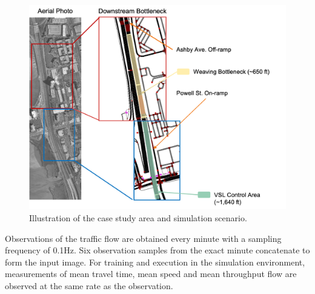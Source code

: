 \documentclass[11pt, letterpaper]{article}
\begin{document}
\begin{figure}[!ht]
    \centering
    \includegraphics[width=\textwidth]{img/sim_area.png}
    \caption{Illustration of the case study area and simulation scenario.}
    \label{fig:3}
\end{figure}

Observations of the traffic flow are obtained every minute with a sampling frequency of 0.1Hz. Six observation samples from the exact minute concatenate to form the input image. For training and execution in the simulation environment, measurements of mean travel time, mean speed and mean throughput flow are observed at the same rate as the observation.
\end{document}
